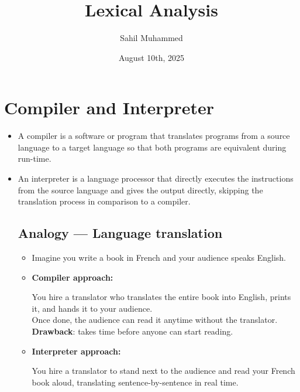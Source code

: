 \documentclass[hidelinks]{article}
\title{\textbf{Lexical Analysis}}
\author{Sahil Muhammed}
\date{August 10th, 2025}
\begin{document}
\hypersetup{bookmarksnumbered=true,}
\maketitle

\begin{Large}
\tableofcontents
\end{Large}%
\pagebreak

\section{Compiler and Interpreter}

\begin{itemize}
    \item A compiler is a software or program that translates programs from a source language to a target language so that both programs are equivalent during run-time.
    \item An interpreter is a language processor that directly executes the instructions from the source language and gives the output directly, skipping the translation process in comparison to a compiler.

    \subsection{Analogy — Language translation}

    \begin{itemize}
        \item Imagine you write a book in French and your audience speaks English.

        \item \textbf{Compiler approach:}

        You hire a translator who translates the entire book into English, prints it, and hands it to your audience. \\ 

        Once done, the audience can read it anytime without the translator. \\

        \textbf{Drawback}: takes time before anyone can start reading.

        \item \textbf{Interpreter approach:}

        You hire a translator to stand next to the audience and read your French book aloud, translating sentence-by-sentence in real time. \\


\end{itemize}
\end{itemize}
\end{document}
